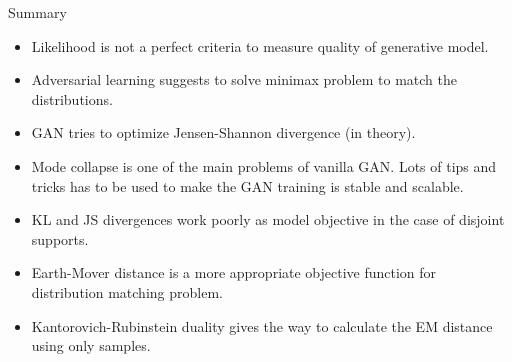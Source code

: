 \begin{frame}{Summary}
	\begin{itemize}
		\item Likelihood is not a perfect criteria to measure quality of generative model.		
		\vfill
		\item Adversarial learning suggests to solve minimax problem to match the distributions.
		\vfill
		\item GAN tries to optimize Jensen-Shannon divergence (in theory).
		\vfill
		\item Mode collapse is one of the main problems of vanilla GAN.  Lots of tips and tricks has to be used to make the GAN training is stable and scalable.
		\vfill
		\item KL and JS divergences work poorly as model objective in the case of disjoint supports.
		\vfill
		\item Earth-Mover distance is a more appropriate objective function for distribution matching problem.	
		\vfill
		\item Kantorovich-Rubinstein duality gives the way to calculate the EM distance using only samples.
	\end{itemize}
\end{frame}
 
